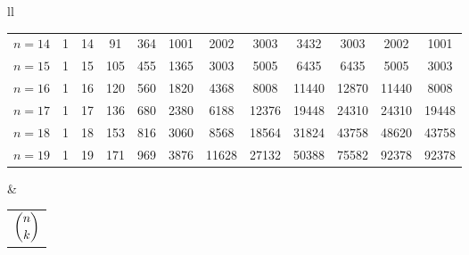 \begin{tabular}{ll}
\begin{tabular}[t]{|l|c|c|c|c|c|c|c|c|c|c|c|}
$n=14$ & 1 & 14 & 91 & 364 & 1001 & 2002 & 3003 & 3432 & 3003 & 2002 & 1001\\
$n=15$ & 1 & 15 & 105 & 455 & 1365 & 3003 & 5005 & 6435 & 6435 & 5005 & 3003\\
\hline\pstrut{2pt}%
$n=16$ & 1 & 16 & 120 & 560 & 1820 & 4368 & 8008 & 11440 & 12870 & 11440 & 8008\\
$n=17$ & 1 & 17 & 136 & 680 & 2380 & 6188 & 12376 & 19448 & 24310 & 24310 & 19448\\
$n=18$ & 1 & 18 & 153 & 816 & 3060 & 8568 & 18564 & 31824 & 43758 & 48620 & 43758\\
$n=19$ & 1 & 19 & 171 & 969 & 3876 & 11628 & 27132 & 50388 & 75582 & 92378 & 92378\\
\hline
\end{tabular}
& \begin{tabular}[t]{l}
\\
$\dbinom{n}{k}$
\end{tabular}
\end{tabular}

